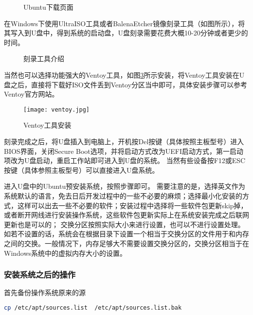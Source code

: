 \documentclass[lang=cn,a4paper,newtx]{elegantpaper}
\begin{document}
\begin{figure}[hbpt]
    \centering
    \caption{Ubuntu下载页面}
    \label{fig:download_webpage}
\end{figure}


在Windows下使用UltraISO工具或者BalenaEtcher镜像刻录工具（如图所示），将其写入到U盘中，得到系统的启动盘，U盘刻录需要花费大概10-20分钟或者更少的时间。


\begin{figure}[hbpt]
  \centering
  \caption{刻录工具介绍}
  \label{fig:write_imgs_page}
\end{figure}

当然也可以选择功能强大的Ventoy工具，如图\ref{fig:ventoy}所示安装，将Ventoy工具安装在U盘之后，直接将下载好ISO文件丢到Ventoy分区当中即可，具体安装步骤可以参考Ventoy官方网站。

\begin{figure}[hbpt]
  \centering
  \texttt{[image: ventoy.jpg]}
  \caption{Ventoy工具安装}
  \label{fig:ventoy}
\end{figure}

刻录完成之后，将U盘插入到电脑上，开机按Del按键（具体按照主板型号）进入BIOS界面，关闭Secure Boot选项，并将启动方式改为UEFI启动方式，第一启动项改为U盘启动，重启工作站即可进入到U盘的系统。
当然有些设备按F12或ESC按键（具体参照主板型号）可以直接进入U盘系统。

进入U盘中的Ubuntu预安装系统，按照步骤即可。
需要注意的是，选择英文作为系统默认的语言，免去日后开发过程中的一些不必要的麻烦；选择最小化安装的方式，这样可以出去一些不必要的软件；安装过程中选择将一些软件包更新skip掉，或者断开网线进行安装操作系统，这些软件包更新实际上在系统安装完成之后联网更新也是可以的；
交换分区按照实际大小来进行设置，也可以不进行设置处理。如若不设置的话，系统会在根据目录下设置一个相当于交换分区的文件用于和内存之间的交换。一般情况下，内存足够大不需要设置交换分区的，交换分区相当于在Windows系统中的虚拟内存大小的设置。

\subsubsection{安装系统之后的操作}
首先备份操作系统原来的源
\begin{lstlisting}[language=bash]
cp /etc/apt/sources.list  /etc/apt/sources.list.bak
\end{lstlisting}
\end{document}
